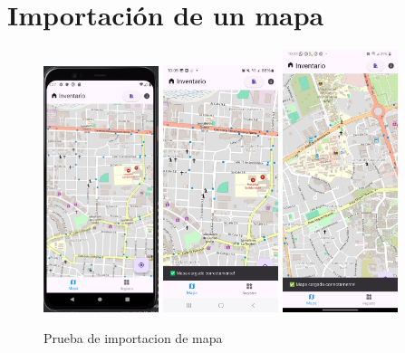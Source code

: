 \section{Importación de un mapa}
\begin{figure}[h]
    \includegraphics[width=0.3\textwidth]{Graphics/Capitulo 4/Pixel 4 [emulador]/4.2/1.png}
    \includegraphics[width=0.3\textwidth]{Graphics/Capitulo 4/Galaxy S23 Ultra Android/4.2/3.jpg}
    \includegraphics[width=0.3\textwidth]{Graphics/Capitulo 4/LG Android 13/4.2/2.png}
    \caption{Prueba de importacion de mapa}
    \label{fig:figura20}
\end{figure}

